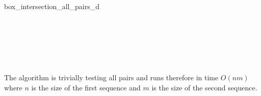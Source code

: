\begin{ccRefFunction}{box_intersection_all_pairs_d}
\ccSeeAlso

\\
\\

\\
\\

%
%


\ccImplementation

The algorithm is trivially testing all pairs and runs therefore in time
$O(nm)$ where $n$ is the size of the first sequence and $m$ is the
size of the second sequence.

\end{ccRefFunction}


